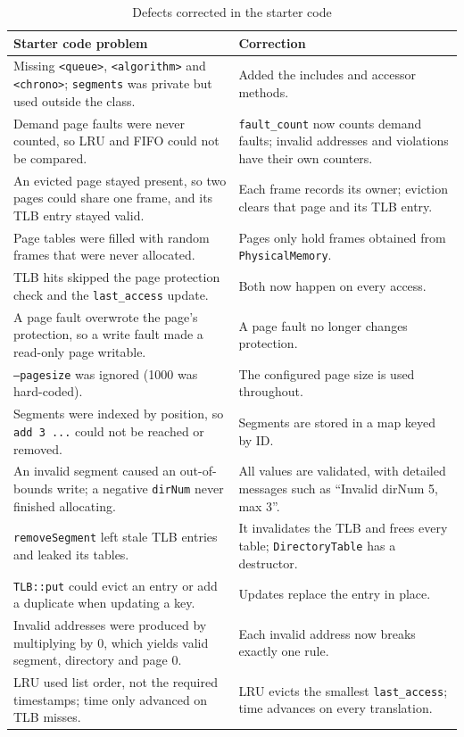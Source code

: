 \documentclass[11pt]{article}
\newcommand{\code}[1]{\texttt{#1}}
\begin{document}
\begin{table}[H]
\centering
\small
\begin{tabularx}{\textwidth}{XX}
\toprule
\textbf{Starter code problem} & \textbf{Correction} \\
\midrule
Missing \code{<queue>}, \code{<algorithm>} and \code{<chrono>}; \code{segments} was private but used outside the class. & Added the includes and accessor methods. \\
Demand page faults were never counted, so LRU and FIFO could not be compared. & \code{fault\_count} now counts demand faults; invalid addresses and violations have their own counters. \\
An evicted page stayed present, so two pages could share one frame, and its TLB entry stayed valid. & Each frame records its owner; eviction clears that page and its TLB entry. \\
Page tables were filled with random frames that were never allocated. & Pages only hold frames obtained from \code{PhysicalMemory}. \\
TLB hits skipped the page protection check and the \code{last\_access} update. & Both now happen on every access. \\
A page fault overwrote the page's protection, so a write fault made a read-only page writable. & A page fault no longer changes protection. \\
\code{--pagesize} was ignored (1000 was hard-coded). & The configured page size is used throughout. \\
Segments were indexed by position, so \code{add 3 ...} could not be reached or removed. & Segments are stored in a map keyed by ID. \\
An invalid segment caused an out-of-bounds write; a negative \code{dirNum} never finished allocating. & All values are validated, with detailed messages such as ``Invalid dirNum 5, max 3''. \\
\code{removeSegment} left stale TLB entries and leaked its tables. & It invalidates the TLB and frees every table; \code{DirectoryTable} has a destructor. \\
\code{TLB::put} could evict an entry or add a duplicate when updating a key. & Updates replace the entry in place. \\
Invalid addresses were produced by multiplying by 0, which yields valid segment, directory and page 0. & Each invalid address now breaks exactly one rule. \\
LRU used list order, not the required timestamps; time only advanced on TLB misses. & LRU evicts the smallest \code{last\_access}; time advances on every translation. \\
\bottomrule
\end{tabularx}
\caption{Defects corrected in the starter code}
\end{table}
\end{document}
